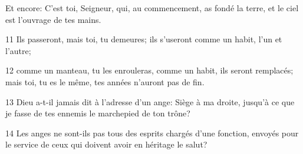 
Et encore: C’est toi, Seigneur, qui, au commencement, as fondé la terre, et le ciel est l’ouvrage de tes mains.

11 Ils passeront, mais toi, tu demeures; ils s’useront comme un habit, l’un et l’autre;

12 comme un manteau, tu les enrouleras, comme un habit, ils seront remplacés; mais toi, tu es le même, tes années n’auront pas de fin.

13 Dieu a-t-il jamais dit à l’adresse d’un ange: Siège à ma droite, jusqu’à ce que je fasse de tes ennemis le marchepied de ton trône?

14 Les anges ne sont-ils pas tous des esprits chargés d’une fonction, envoyés pour le service de ceux qui doivent avoir en héritage le salut?
